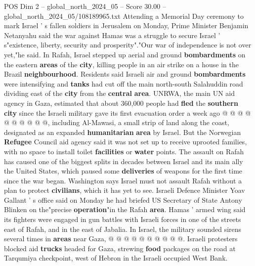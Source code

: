 \begin{textsample}{POS Dim 2 – global\_north\_2024\_05 – Score 30.00 – global\_north\_2024\_05/108189965.txt}
Attending a Memorial Day ceremony to mark Israel ' s fallen soldiers in Jerusalem on Monday, Prime Minister Benjamin Netanyahu said the war against Hamas was a struggle to secure Israel ' s"existence, liberty, security and prosperity"."Our war of independence is not over yet,"he said.
In Rafah, Israel stepped up aerial and ground \textbf{bombardments} on the eastern \textbf{areas} of the \textbf{city}, killing people in an air strike on a house in the Brazil \textbf{neighbourhood}.
Residents said Israeli air and ground \textbf{bombardments} were intensifying and \textbf{tanks} had cut off the main north-south Salahuddin road dividing east of the \textbf{city} from the \textbf{central} \textbf{area}.
UNRWA, the main UN aid agency in Gaza, estimated that about 360,000 people had \textbf{fled} the \textbf{southern} \textbf{city} since the Israeli military gave its first evacuation order a week ago @ @ @ @ @ @ @ @ @ @, including Al-Mawasi, a small strip of land along the coast, designated as an expanded \textbf{humanitarian} \textbf{area} by Israel.
But the Norwegian \textbf{Refugee} Council aid agency said it was not set up to receive uprooted families, with no space to install toilet \textbf{facilities} or \textbf{water} points.
The assault on Rafah has caused one of the biggest splits in decades between Israel and its main ally the United States, which paused some \textbf{deliveries} of weapons for the first time since the war began.
Washington says Israel must not assault Rafah without a plan to protect \textbf{civilians}, which it has yet to see.
Israeli Defence Minister Yoav Gallant ' s office said on Monday he had briefed US Secretary of State Antony Blinken on the"precise \textbf{operation}"in the Rafah \textbf{area}.
Hamas ' armed wing said its fighters were engaged in gun battles with Israeli forces in one of the streets east of Rafah, and in the east of Jabalia.
In Israel, the military sounded sirens several times in \textbf{areas} near Gaza, @ @ @ @ @ @ @ @ @ @.
Israeli protesters blocked aid \textbf{trucks} headed for Gaza, strewing \textbf{food} packages on the road at Tarqumiya checkpoint, west of Hebron in the Israeli occupied West Bank.

\end{textsample}
